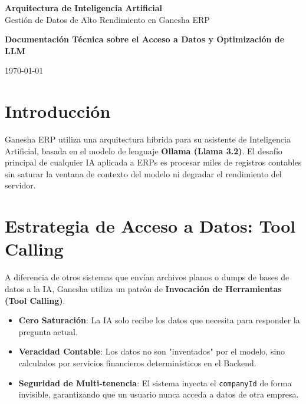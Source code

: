 \documentclass[a4paper,12pt]{article}
\begin{document}
\begin{titlepage}
    \centering
    \vspace*{2cm}
    {\Huge\bfseries\color{ganeshaprue} Arquitectura de Inteligencia Artificial}\\[0.5cm]
    {\Large\color{ganeshaaccent} Gestión de Datos de Alto Rendimiento en Ganesha ERP}\\[2cm]
    
    \begin{tcolorbox}[colback=ganeshaprue,colframe=ganeshaprue,arc=5pt,left=20pt,right=20pt,top=20pt,bottom=20pt]
        \centering
        \color{white}
        \textbf{Documentación Técnica sobre el Acceso a Datos y Optimización de LLM}
    \end{tcolorbox}
    
    \vfill
    {\large \today}
\end{titlepage}

\tableofcontents
\newpage

\section{Introducción}
Ganesha ERP utiliza una arquitectura híbrida para su asistente de Inteligencia Artificial, basada en el modelo de lenguaje \textbf{Ollama (Llama 3.2)}. El desafío principal de cualquier IA aplicada a ERPs es procesar miles de registros contables sin saturar la ventana de contexto del modelo ni degradar el rendimiento del servidor.

\section{Estrategia de Acceso a Datos: Tool Calling}
A diferencia de otros sistemas que envían archivos planos o dumps de bases de datos a la IA, Ganesha utiliza un patrón de \textbf{Invocación de Herramientas (Tool Calling)}.

\begin{tcolorbox}[title=Ventajas del Modelo TAG (Tool-Augmented Generation), colback=blue!5, colframe=ganeshaaccent]
    \begin{itemize}
        \item \textbf{Cero Saturación}: La IA solo recibe los datos que necesita para responder la pregunta actual.
        \item \textbf{Veracidad Contable}: Los datos no son "inventados" por el modelo, sino calculados por servicios financieros determinísticos en el Backend.
        \item \textbf{Seguridad de Multi-tenencia}: El sistema inyecta el \texttt{companyId} de forma invisible, garantizando que un usuario nunca acceda a datos de otra empresa.
    \end{itemize}
\end{tcolorbox}
\end{document}
